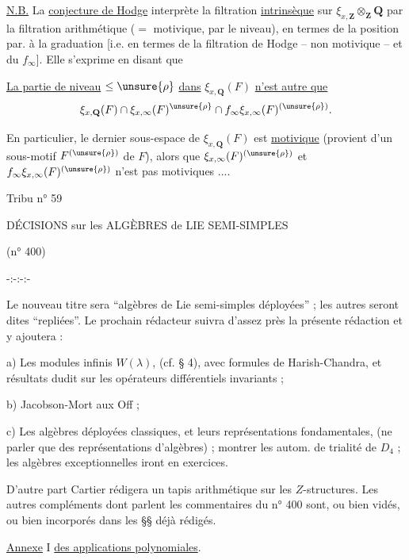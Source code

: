 \uline{N.B.} La \uline{conjecture de Hodge} interprète la filtration \uline{intrinsèque} sur  $\xi_{x,\mathbf Z}\otimes_{\mathbf Z}\mathbf Q$  par la filtration arithmétique ($=$ motivique, par le niveau), en termes de la position par. à la graduation [i.e. en termes de la filtration de Hodge -- non motivique -- et du $f_\infty$]. Elle s'exprime en disant que


\uline{La partie de niveau} $\leq\unsure{\rho}$ \uline{dans} $\xi_{x,\mathbf Q}(F)$ \uline{n'est autre que}
\[
\xi_{x,\mathbf Q}(F)\cap\xi_{x,\infty}(F)^{\unsure{\rho}}\cap f_\infty\xi_{x,\infty}(F)^{(\unsure{\rho})}.
\]

En particulier, le dernier sous-espace de $\xi_{x,\mathbf Q}(F)$ est \uline{motivique} (provient d'un sous-motif $F^{(\unsure{\rho})}$ de $F$), alors que $\xi_{x,\infty}(F)^{(\unsure{\rho})}$ et $f_\infty\xi_{x,\infty}(F)^{(\unsure{\rho})}$ n'est pas motiviques .... 


\hfill Tribu n° 59

DÉCISIONS sur les ALGÈBRES de LIE SEMI-SIMPLES

(n° 400)

-:-:-:-

Le nouveau titre sera ``algèbres de Lie semi-simples déployées'' ; les autres seront dites ``repliées''. Le prochain rédacteur suivra d'assez près la présente rédaction et y ajoutera :

a) Les modules infinis $W(\lambda)$, (cf. § 4), avec formules de Harish-Chandra, et résultats dudit sur les opérateurs différentiels invariants ;

b) Jacobson-Mort aux Off ;

c) Les algèbres déployées classiques, et leurs représentations fondamentales, (ne parler que des représentations d'algèbres) ; montrer les autom. de trialité de $D_4$ ; les algèbres exceptionnelles iront en exercices.

D'autre part Cartier rédigera un tapis arithmétique sur les $Z$-structures. Les autres compléments dont parlent les commentaires du n° 400 sont, ou bien vidés, ou bien incorporés dans les §§ déjà rédigés.

\uline{Annexe} I \uline{des applications polynomiales}.

